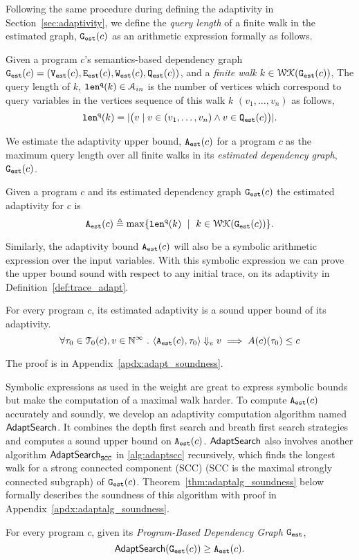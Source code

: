 Following the same procedure during defining the adaptivity in Section~\ref{sec:adaptivity}, we define
the \emph{query length} of a finite walk in the estimated graph, $\mathtt{{G_{est}}}(c)$ as an arithmetic expression formally as follows.
\begin{defn}
  \label{def:qlen}
  Given 
  a program $c$'s semantics-based dependency graph 
  $\mathtt{{G_{est}}}({c}) = (\mathtt{{V_{est}}}(c), \mathtt{{E_{est}}}(c), \mathtt{{W_{est}}}(c), \mathtt{{Q_{est}}}(c))$, 
   and a \emph{finite walk} $k \in \mathcal{WK}(\mathtt{{G_{est}}}(c))$,
  The query length of $k$, $\mathtt{len}^{\tt q}(k) \in \mathcal{A}_{in}$ 
  is the number of vertices which correspond to query variables in the vertices sequence of this walk $k$
  $(v_1, \ldots, v_{n})$ as follows, 
  \[
    \mathtt{len}^{\tt q}(k) = |\big( v \mid v \in (v_1, \ldots, v_{n}) \land v \in \mathtt{{Q_{est}}}(c) \big)|.
  \]
  \end{defn}
  We estimate the adaptivity upper bound, ${\mathtt{A_{est}}}(c)$ for a program $c$ as the maximum query length over all finite walks in its \emph{estimated dependency graph}, $\mathtt{{G_{est}}}({c})$. 
\begin{defn}
\label{def:prog_adapt}
{
Given a program ${c}$ and its estimated dependency graph 
$\mathtt{{G_{est}}}({c})$
%
the estimated adaptivity for $c$ is 
\[
\progA({c})
\triangleq \max
\left\{ \qlen(k) \ \mid \  k \in \walks(\progG(c))\right \}.
\]
}
\end{defn}
Similarly, the adaptivity bound ${\mathtt{A_{est}}}(c)$ will also be a symbolic arithmetic expression over the input variables. With this symbolic expression we can prove the upper bound sound with respect to any initial trace, on its adaptivity in Definition~\ref{def:trace_adapt}.
\begin{thm}
  \label{thm:adaptfun_sound}
  For every program $c$, 
  its estimated adaptivity is a sound upper bound of its adaptivity.
   \[
   \forall \mathtt{\tau}_0 \in \mathcal{T}_{0}(c), v \in \mathbb{N}^{\infty} ~.~ 
\langle {\ensuremath{\mathtt{A_{est}}}}(c), \mathtt{\tau}_0 \rangle \Downarrow_e v \implies A(c)(\mathtt{\tau}_0) \leq c
\] 
\end{thm}
The proof is in Appendix~\ref{apdx:adapt_soundness}.


Symbolic expressions as used in the weight  are great to express symbolic bounds but make the computation of 
a maximal walk harder. 
To compute ${\mathtt{A_{est}}}(c)$ accurately and soundly, we develop an adaptivity computation algorithm named $\mathsf{AdaptSearch}$.
It combines the depth first search and breath first search strategies and computes a sound upper bound on ${\mathtt{A_{est}}}(c)$.
$\mathsf{AdaptSearch}$ also involves another algorithm $\mathsf{AdaptSearch}_{\mathtt{SCC}}$ in \ref{alg:adaptscc} recursively, which finds the longest walk for a strong connected component (SCC) (SCC is the maximal strongly connected subgraph) of $\mathtt{{G_{est}}}(c)$.
Theorem~\ref{thm:adaptalg_soundness} below formally describes the soundness of this algorithm with proof in Appendix~\ref{apdx:adaptalg_soundness}.
\begin{thm}
    \label{thm:adaptalg_soundness}
    For every program $c$, given its \emph{Program-Based Dependency Graph} $\mathtt{{G_{est}}}$,
    \[ \mathsf{AdaptSearch}(\mathtt{{G_{est}}}({c})) \geq {\ensuremath{\mathtt{A_{est}}}}(c).\]
\end{thm}

